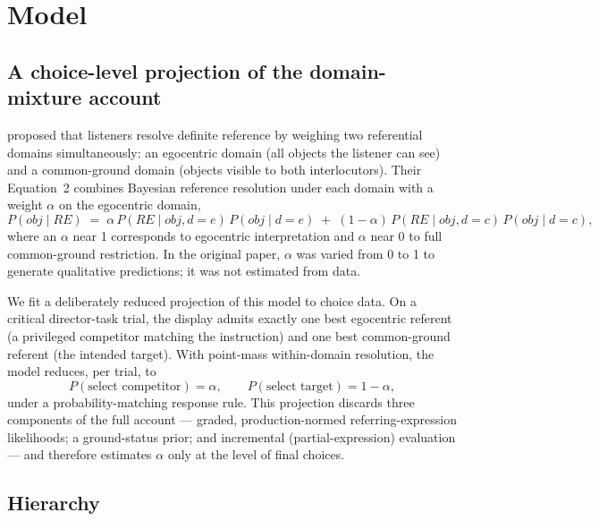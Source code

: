 \documentclass[11pt]{article}
\begin{document}
\section{Model}\label{sec:model}

\subsection{A choice-level projection of the domain-mixture account}\label{sec:projection}

\citet{heller2016} proposed that listeners resolve definite reference by weighing
two referential domains simultaneously: an egocentric domain (all objects the
listener can see) and a common-ground domain (objects visible to both
interlocutors). Their Equation~2 combines Bayesian reference resolution under
each domain with a weight $\alpha$ on the egocentric domain,
\begin{equation}\label{eq:heller}
  P(\mathit{obj} \mid \mathit{RE}) \;=\;
    \alpha\, P(\mathit{RE} \mid \mathit{obj}, d{=}e)\,P(\mathit{obj} \mid d{=}e)
    \;+\; (1-\alpha)\, P(\mathit{RE} \mid \mathit{obj}, d{=}c)\,P(\mathit{obj} \mid d{=}c),
\end{equation}
where an $\alpha$ near 1 corresponds to egocentric interpretation and $\alpha$
near 0 to full common-ground restriction. In the original paper, $\alpha$ was
varied from 0 to 1 to generate qualitative predictions; it was not estimated
from data.

We fit a deliberately reduced projection of this model to choice data. On a
critical director-task trial, the display admits exactly one best egocentric
referent (a privileged competitor matching the instruction) and one best
common-ground referent (the intended target). With point-mass within-domain
resolution, the model reduces, per trial, to
\begin{equation}\label{eq:projection}
  P(\text{select competitor}) = \alpha, \qquad
  P(\text{select target}) = 1 - \alpha,
\end{equation}
under a probability-matching response rule. This projection discards three
components of the full account --- graded, production-normed referring-expression
likelihoods; a ground-status prior; and incremental (partial-expression)
evaluation --- and therefore estimates $\alpha$ only at the level of final
choices.

\subsection{Hierarchy}\label{sec:hierarchy}
\end{document}
